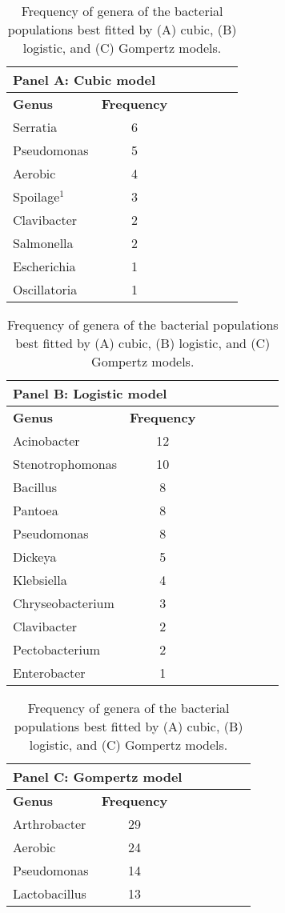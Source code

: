\documentclass[11pt]{article}
\begin{document}
	
	\begin{table}[htbp]
		\caption{Frequency of genera of the bacterial populations best fitted by (A) cubic, (B) logistic, and (C) Gompertz models.}
		\label{table2}
		\begin{tabularx}{\linewidth}{l*{6}{c}}
			\toprule
			\multicolumn{7}{l}{\textbf{Panel A: Cubic model}} \\
			\midrule
			\textbf{Genus} & \textbf{Frequency} \\
			Serratia & 6 \\
			Pseudomonas & 5 \\
			Aerobic & 4 \\
			Spoilage$^
			{1}$ & 3 \\
			Clavibacter & 2 \\
			Salmonella & 2 \\
			Escherichia & 1 \\
			Oscillatoria & 1 \\
			\bottomrule   
		\end{tabularx}
		\begin{tabularx}{\linewidth}{l*{7}{c}}
			\toprule
			\multicolumn{7}{l}{\textbf{Panel B: Logistic model}} \\
			\midrule
			\textbf{Genus} & \textbf{Frequency} \\
			Acinobacter & 12 \\
			Stenotrophomonas & 10 \\
			Bacillus & 8 \\
			Pantoea & 8 \\
			Pseudomonas & 8 \\
			Dickeya & 5 \\
			Klebsiella & 4 \\
			Chryseobacterium & 3 \\
			Clavibacter & 2 \\
			Pectobacterium & 2 \\
			Enterobacter & 1 \\
			\bottomrule
		\end{tabularx}
			\begin{tabularx}{\linewidth}{l*{7}{c}}
		\toprule
		\multicolumn{7}{l}{\textbf{Panel C: Gompertz model}} \\
					\midrule
		\textbf{Genus} & \textbf{Frequency} \\
		Arthrobacter & 29 \\
		Aerobic & 24 \\
		Pseudomonas & 14 \\
		Lactobacillus & 13 \\

\end{tabularx}
\end{table}
\end{document}
